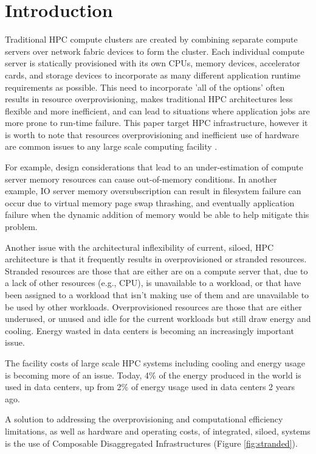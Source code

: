 \section{Introduction}

Traditional HPC compute clusters are created by combining separate compute servers over network fabric devices to form the cluster.  Each individual compute server is statically provisioned with its own CPUs, memory devices, accelerator cards, and storage devices to incorporate as many different application runtime requirements as possible\cite{beowulf}. This need to incorporate 'all of the options' often results in resource overprovisioning, makes traditional HPC architectures less flexible and more inefficient, and can lead to situations where application jobs are more prone to run-time failure. This paper target HPC infrastructure, however it is worth to note that resources overprovisioning and inefficient use of hardware are common issues to any large scale computing facility \cite{borg-google, pond}.

For example, design considerations that lead to an under-estimation of compute server memory resources can cause out-of-memory conditions.  In another example, IO server memory oversubscription can result in filesystem failure can occur due to virtual memory page swap thrashing, and eventually application failure when the dynamic addition of memory would be able to help mitigate this problem.  

Another issue with the architectural inflexibility of current, siloed, HPC architecture is that it frequently results in overprovisioned or stranded resources. Stranded resources are those that are either are on a compute server that, due to a lack of other resources (e.g., CPU), is unavailable to a workload, or that have been assigned to a workload that isn't making use of them and are unavailable to be used by other workloads. Overprovisioned resources are those that are either underused, or unused and idle for the current workloads but still draw energy and cooling. Energy wasted in data centers is becoming an increasingly important issue\cite{eere}.

The facility costs of large scale HPC systems including cooling and energy usage is becoming more of an issue. Today, 4\% of the energy produced in the world is used in data centers, up from 2\% of energy usage used in data centers 2 years ago\cite{dw,vmware}. 

A solution to addressing the overprovisioning and computational efficiency limitations, as well as hardware and operating costs, of integrated, siloed, systems is the use of Composable Disaggregated Infrastructures (Figure \ref{fig:stranded}).

